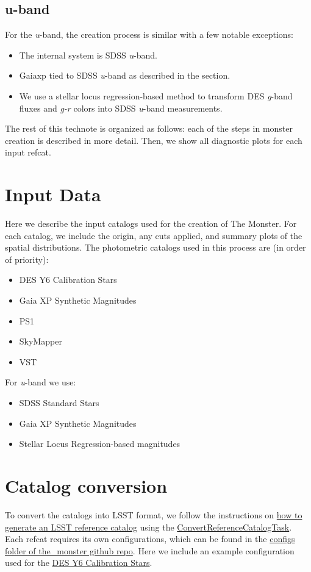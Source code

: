 \subsection{u-band}
For the \textit{u}-band, the creation process is similar with a few notable exceptions:
\begin{itemize}
    \item The internal system is SDSS \textit{u}-band.
    \item Gaiaxp tied to SDSS \textit{u}-band as described in the section.
    \item We use a stellar locus regression-based method to transform DES \textit{g}-band fluxes and \textit{g-r} colors into SDSS \textit{u}-band measurements.
\end{itemize}

The rest of this technote is organized as follows: each of the steps in monster creation is described in more detail. Then, we show all diagnostic plots for each input refcat.

\section{Input Data}
Here we describe the input catalogs used for the creation of The Monster. For each catalog, we include the origin, any cuts applied, and summary plots of the spatial distributions. The photometric catalogs used in this process are (in order of priority):
\begin{itemize}
    \item DES Y6 Calibration Stars
    \item Gaia XP Synthetic Magnitudes
    \item PS1
    \item SkyMapper
    \item VST
\end{itemize}

For \textit{u}-band we use:
\begin{itemize}
    \item SDSS Standard Stars
    \item Gaia XP Synthetic Magnitudes
    \item Stellar Locus Regression-based magnitudes
\end{itemize}

\section{Catalog conversion}
To convert the catalogs into LSST format, we follow the instructions on \href{https://pipelines.lsst.io/modules/lsst.meas.algorithms/creating-a-reference-catalog.html}{how to generate an LSST reference catalog} using the \href{https://pipelines.lsst.io/modules/lsst.meas.algorithms/tasks/lsst.meas.algorithms.ConvertReferenceCatalogTask.html#lsst-task-lsst-meas-algorithms-convertreferencecatalog-convertreferencecatalogtask}{ConvertReferenceCatalogTask}. Each refcat requires its own configurations, which can be found in the \href{https://github.com/lsst-dm/the_monster/tree/main/configs}{configs folder of the\_monster github repo}. Here we include an example configuration used for the \hyperref[des-y6-calibration-stars]{DES Y6 Calibration Stars}.

